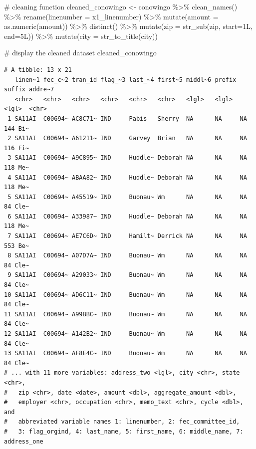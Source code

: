 \documentclass[
  letterpaper,
  DIV=11,
  numbers=noendperiod]{scrreprt}
\newenvironment{Shaded}{\begin{snugshade}}{\end{snugshade}}
\newcommand{\AttributeTok}[1]{\textcolor[rgb]{0.40,0.45,0.13}{#1}}
\newcommand{\CommentTok}[1]{\textcolor[rgb]{0.37,0.37,0.37}{#1}}
\newcommand{\FunctionTok}[1]{\textcolor[rgb]{0.28,0.35,0.67}{#1}}
\newcommand{\NormalTok}[1]{\textcolor[rgb]{0.00,0.23,0.31}{#1}}
\newcommand{\OtherTok}[1]{\textcolor[rgb]{0.00,0.23,0.31}{#1}}
\newcommand{\SpecialCharTok}[1]{\textcolor[rgb]{0.37,0.37,0.37}{#1}}
\begin{document}
\begin{Shaded}
\begin{Highlighting}[]
\CommentTok{\# cleaning function}
\NormalTok{cleaned\_conowingo }\OtherTok{\textless{}{-}}\NormalTok{ conowingo }\SpecialCharTok{\%\textgreater{}\%}
  \FunctionTok{clean\_names}\NormalTok{() }\SpecialCharTok{\%\textgreater{}\%}
  \FunctionTok{rename}\NormalTok{(}\AttributeTok{linenumber =}\NormalTok{ x1\_linenumber) }\SpecialCharTok{\%\textgreater{}\%}
  \FunctionTok{mutate}\NormalTok{(}\AttributeTok{amount =} \FunctionTok{as.numeric}\NormalTok{(amount)) }\SpecialCharTok{\%\textgreater{}\%}
  \FunctionTok{distinct}\NormalTok{() }\SpecialCharTok{\%\textgreater{}\%}
  \FunctionTok{mutate}\NormalTok{(}\AttributeTok{zip =} \FunctionTok{str\_sub}\NormalTok{(zip, }\AttributeTok{start=}\NormalTok{1L, }\AttributeTok{end=}\NormalTok{5L)) }\SpecialCharTok{\%\textgreater{}\%}
  \FunctionTok{mutate}\NormalTok{(}\AttributeTok{city =} \FunctionTok{str\_to\_title}\NormalTok{(city))}


\CommentTok{\# display the cleaned dataset}
\NormalTok{cleaned\_conowingo}
\end{Highlighting}
\end{Shaded}

\begin{verbatim}
# A tibble: 13 x 21
   linen~1 fec_c~2 tran_id flag_~3 last_~4 first~5 middl~6 prefix suffix addre~7
   <chr>   <chr>   <chr>   <chr>   <chr>   <chr>   <lgl>   <lgl>  <lgl>  <chr>  
 1 SA11AI  C00694~ AC8C71~ IND     Pabis   Sherry  NA      NA     NA     144 Bi~
 2 SA11AI  C00694~ A61211~ IND     Garvey  Brian   NA      NA     NA     116 Fi~
 3 SA11AI  C00694~ A9C895~ IND     Huddle~ Deborah NA      NA     NA     118 Me~
 4 SA11AI  C00694~ ABAA82~ IND     Huddle~ Deborah NA      NA     NA     118 Me~
 5 SA11AI  C00694~ A45519~ IND     Buonau~ Wm      NA      NA     NA     84 Cle~
 6 SA11AI  C00694~ A33987~ IND     Huddle~ Deborah NA      NA     NA     118 Me~
 7 SA11AI  C00694~ AE7C6D~ IND     Hamilt~ Derrick NA      NA     NA     553 Be~
 8 SA11AI  C00694~ A07D7A~ IND     Buonau~ Wm      NA      NA     NA     84 Cle~
 9 SA11AI  C00694~ A29033~ IND     Buonau~ Wm      NA      NA     NA     84 Cle~
10 SA11AI  C00694~ AD6C11~ IND     Buonau~ Wm      NA      NA     NA     84 Cle~
11 SA11AI  C00694~ A99BBC~ IND     Buonau~ Wm      NA      NA     NA     84 Cle~
12 SA11AI  C00694~ A142B2~ IND     Buonau~ Wm      NA      NA     NA     84 Cle~
13 SA11AI  C00694~ AF8E4C~ IND     Buonau~ Wm      NA      NA     NA     84 Cle~
# ... with 11 more variables: address_two <lgl>, city <chr>, state <chr>,
#   zip <chr>, date <date>, amount <dbl>, aggregate_amount <dbl>,
#   employer <chr>, occupation <chr>, memo_text <chr>, cycle <dbl>, and
#   abbreviated variable names 1: linenumber, 2: fec_committee_id,
#   3: flag_orgind, 4: last_name, 5: first_name, 6: middle_name, 7: address_one
\end{verbatim}
\end{document}

